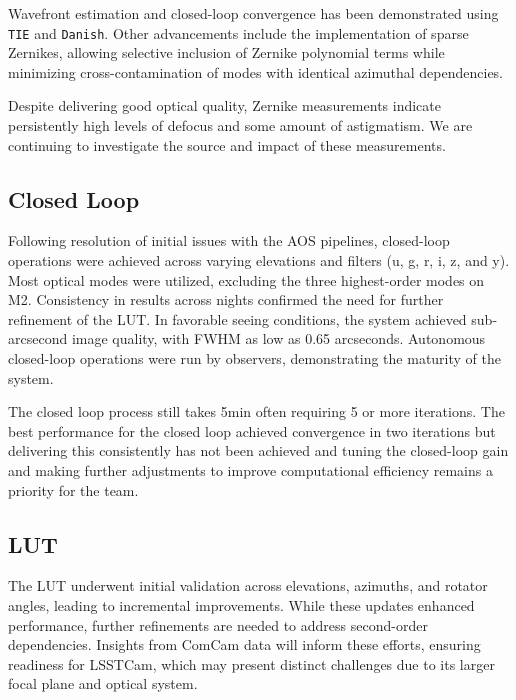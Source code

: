 Wavefront estimation and closed-loop convergence has been demonstrated using \texttt{TIE} and \texttt{Danish}. Other advancements include the implementation of sparse Zernikes, allowing selective inclusion of Zernike polynomial terms while minimizing cross-contamination 
of modes with identical azimuthal dependencies.

Despite delivering good optical quality, Zernike measurements indicate persistently high levels of defocus and some amount of astigmatism. We are continuing to investigate the source and impact of these measurements.

\subsection{Closed Loop}
Following resolution of initial issues with the AOS pipelines, closed-loop operations were achieved across varying elevations and filters (u, g, r, i, z, and y).  Most optical modes were utilized, excluding the three highest-order modes on M2.  Consistency in results across nights confirmed the need for further refinement of the LUT. In favorable seeing conditions, the system achieved sub-arcsecond image quality, with FWHM as low as 0.65 arcseconds. Autonomous closed-loop operations were run by observers, demonstrating the maturity of the system. 


The closed loop process still takes 5min often requiring 5 or more iterations. The best performance for the closed loop achieved convergence in two iterations but delivering this consistently has not been achieved and tuning the closed-loop gain and making further adjustments to improve computational  efficiency remains a priority for the team.

\subsection{LUT}
The LUT underwent initial validation across elevations, azimuths, and rotator angles, 
leading to incremental improvements. While these updates enhanced performance, 
further refinements are needed to address second-order dependencies. Insights 
from ComCam data will inform these efforts, ensuring readiness for LSSTCam, which 
may present distinct challenges due to its larger focal plane and optical system.



